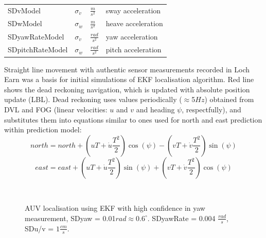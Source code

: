\begin{table}
\begin{tabular}{llll}
\multirow{1}{*}{SDvModel} & \multirow{1}{*}{$\sigma_{\dot{v}}$}  & \multirow{1}{*}{$\frac{m}{s^{2}}$} & \multirow{1}{*}{sway acceleration} \\
\multirow{1}{*}{SDwModel} & \multirow{1}{*}{$\sigma_{\dot{w}}$}  & \multirow{1}{*}{$\frac{m}{s^{2}}$} & \multirow{1}{*}{heave acceleration} \\
\multirow{1}{*}{SDyawRateModel} & \multirow{1}{*}{$\sigma_{\dot{v}}$}  & \multirow{1}{*}{$\frac{rad}{s^{2}}$} & \multirow{1}{*}{yaw acceleration} \\
\multirow{1}{*}{SDpitchRateModel} & \multirow{1}{*}{$\sigma_{\dot{w}}$}  & \multirow{1}{*}{$\frac{rad}{s^{2}}$} & \multirow{1}{*}{pitch acceleration} \\
\bottomrule
\end{tabular} 
\end{table}
Straight line movement with authentic sensor measurements recorded in Loch Earn was a basis for initial simulations of EKF localisation algorithm. Red line shows the dead reckoning navigation, which is updated with absolute position update (LBL). Dead reckoning uses values periodically ($\approx$5$Hz$) obtained from DVL and FOG (linear velocities: $u$ and $v$ and heading $\psi$, respectfully), and substitutes them into equations similar to ones used for north and east prediction within prediction model: 
$$ north = north + (uT+\dot{u}\frac{T^{2}}{2})\cos(\psi) - (vT+\dot{v}\frac{T^{2}}{2})\sin(\psi) $$
$$ east  = east  + (uT+\dot{u}\frac{T^{2}}{2})\sin(\psi) + (vT+\dot{v}\frac{T^{2}}{2})\cos(\psi) $$
\begin{figure}%
  \centering
     \\   
\caption{AUV localisation using EKF with high confidence in yaw measurement, SDyaw = 0.01$rad \approx 0.6 ^{\circ}$. SDyawRate = 0.004 $\frac{rad}{s}$, SDu/v = $1\frac{cm}{s}$.}
\label{fig:auv-sim-straight2}
\end{figure}

